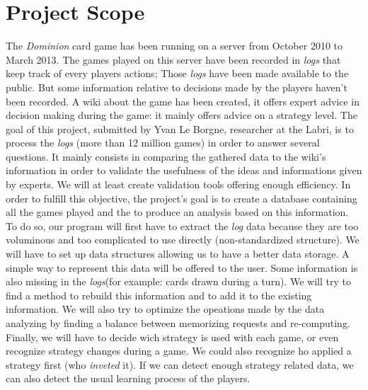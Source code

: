 \documentclass{scrreprt}
\begin{document}
\section{Project Scope}
  The \textit{Dominion} card game has been running on a server from October 2010 to March 2013. The games played on this server have been recorded in \textit{logs} that keep track of every players actions; Those \textit{logs} have been made available to the public. But some information relative to decisions made by the players haven't been recorded.
  \newline A wiki about the game has been created, it offers expert advice in decision making during the game: it mainly offers advice on a strategy level. The goal of this project, submitted by Yvan Le Borgne, researcher at the Labri, is to process the \textit{logs} (more than 12 million games) in order to answer several questions. It mainly consists in comparing the gathered data to the wiki's information in order to validate the usefulness of the ideas and informations given by experts. We will at least create validation tools offering enough efficiency.
  In order to fulfill this objective, the project's goal is to create a database containing all the games played and the to produce an analysis based on this information.
  To do so, our program will first have to extract the \textit{log} data because they are too voluminous and too complicated to use directly (non-standardized structure). We will have to set up data structures allowing us to have a better data storage. A simple way to represent this data will be offered to the user.
  Some information is also missing in the \textit{logs}(for example: cards drawn during a turn). We will try to find a method to rebuild this information and to add it to the existing information.
  We will also try to optimize the opeations made by the data analyzing by finding a balance between memorizing requests and re-computing.
  Finally, we will have to decide wich strategy is used with each game, or even recognize strategy changes during a game. We could also recognize ho applied a strategy first (who \textit{inveted} it).
  If we can detect enough strategy related data, we can also detect the usual learning process of the players.
\end{document}
